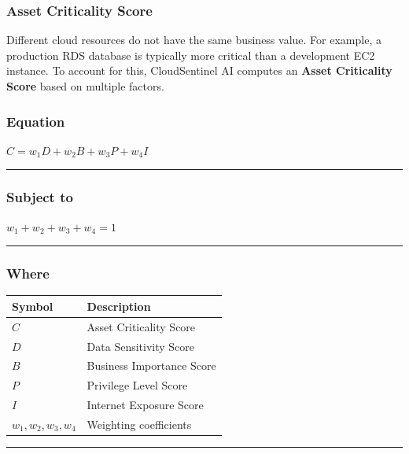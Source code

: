 \subsubsection{Asset Criticality Score}

Different cloud resources do not have the same business value. For example, a production RDS database is typically more critical than a development EC2 instance. To account for this, CloudSentinel AI computes an \textbf{Asset Criticality Score} based on multiple factors.

\subsubsection{\texorpdfstring{\textbf{Equation}}{Equation}}

$C = w_1 D + w_2 B + w_3 P + w_4 I$

\begin{center}\rule{0.5\linewidth}{0.5pt}\end{center}

\subsubsection{\texorpdfstring{\textbf{Subject to}}{Subject to}}

$w_1 + w_2 + w_3 + w_4 = 1$

\begin{center}\rule{0.5\linewidth}{0.5pt}\end{center}

\subsubsection{Where}

\begin{longtable}[]{@{}ll@{}}
\toprule\noalign{}
Symbol & Description \\
\midrule\noalign{}
\endhead
\bottomrule\noalign{}
\endlastfoot
$C$ & Asset Criticality Score \\
$D$ & Data Sensitivity Score \\
$B$ & Business Importance Score \\
$P$ & Privilege Level Score \\
$I$ & Internet Exposure Score \\
$w_1, w_2, w_3, w_4$ & Weighting coefficients \\
\end{longtable}

\begin{center}\rule{0.5\linewidth}{0.5pt}\end{center}

